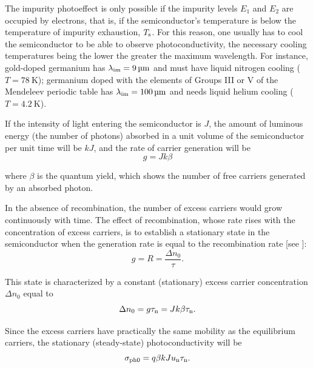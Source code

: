 The impurity photoeffect is only possible if the impurity levels $E_1$ and $E_2$ are occupied by electrons, that is, if the semiconductor's temperature is below the temperature of impurity exhaustion, $T_{\text{s}}$. For this reason, one usually has to cool the semiconductor to be able to observe photoconductivity, the necessary cooling temperatures being the lower the greater the maximum wavelength. For instance, gold-doped germanium has $\lambda_{\text{im}}=\SI{9}{\micro\metre}$ and must have liquid nitrogen cooling ($T=\SI{78}{\kelvin}$); germanium doped with the elements of Groups III or V of the Mendeleev periodic table has $\lambda_{\text{im}}=\SI{100}{\micro\metre}$ and needs liquid helium cooling ($T=\SI{4.2}{\kelvin}$).

If the intensity of light entering the semiconductor is $J$, the amount of luminous energy (the number of photons) absorbed in a unit volume of the semiconductor per unit time will be $kJ$, and the rate of carrier generation will be
\begin{equation}\label{eq:6_46}
	g = J k \beta
\end{equation}

\noindent
where $\beta$ is the quantum yield, which shows the number of free carriers generated by an absorbed photon.

In the absence of recombination, the number of excess carriers would grow continuously with time. The effect of recombination, whose rate rises with the concentration of excess carriers, is to establish
a stationary state in the semiconductor when the generation rate is equal to the recombination rate [see ]:
\vspace{-10pt}
\begin{equation}\label{eq:6_47}
	g = R = \frac{\Delta{n}_0}{\tau}.
\end{equation}

\noindent
This state is characterized by a constant (stationary) excess carrier concentration $\Delta{n}_0$ equal to
\begin{equation}\label{eq:6_48}
	\Delta{n}_0 = g \tau_{\text{n}} = J k \beta \tau_{\text{n}}.
\end{equation}

\noindent
Since the excess carriers have practically the same mobility as the equilibrium carriers, the stationary (steady-state) photoconductivity will be
\begin{equation}\label{eq:6_49}
	\sigma_{\text{ph$0$}} = q \beta k J u_{\text{n}} \tau_{\text{n}}.
\end{equation}

